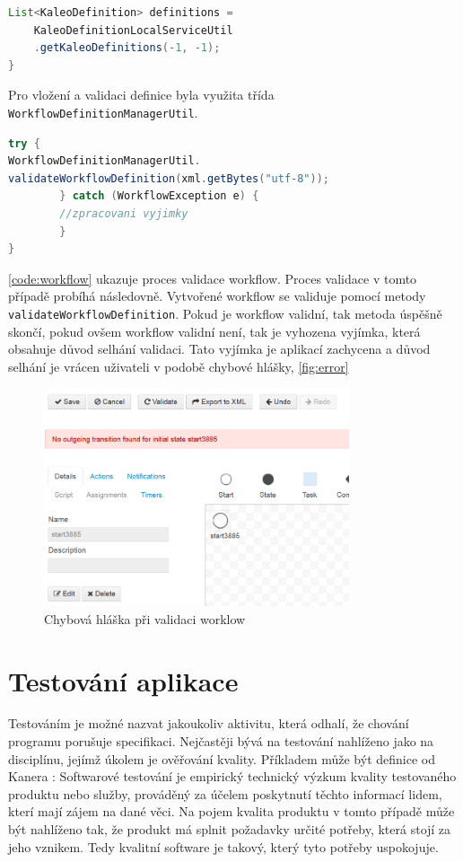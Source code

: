 \documentclass{fithesis}
\begin{document}
\begin{lstlisting}[language=Java, float =h , caption = Načtení workflow definic z portálu , label = code:users ]
 List<KaleoDefinition> definitions = 
	KaleoDefinitionLocalServiceUtil
	.getKaleoDefinitions(-1, -1);
}
\end{lstlisting}

Pro vložení a validaci definice byla využita třída \verb|WorkflowDefinitionManagerUtil|. 

\begin{lstlisting}[language=Java, float =h , caption = Validace workflow pomocí portálového API , label = code:workflow ]
try {
WorkflowDefinitionManagerUtil.
validateWorkflowDefinition(xml.getBytes("utf-8"));
        } catch (WorkflowException e) {
        //zpracovani vyjimky
        }
}
\end{lstlisting}
\autoref{code:workflow} ukazuje proces validace workflow. Proces validace v tomto případě probíhá následovně. Vytvořené workflow se validuje pomocí metody \verb|validateWorkflowDefinition|. Pokud je workflow validní, tak metoda úspěšně skončí, pokud ovšem workflow validní není, tak je vyhozena vyjímka, která obsahuje důvod selhání validaci. Tato vyjímka je aplikací zachycena a důvod selhání je vrácen uživateli v podobě chybové hlášky, 
\autoref{fig:error}

\begin{figure}[htp]
\centering
\includegraphics[width=340px]{images/error_message.png}
\caption{Chybová hláška při validaci worklow}
\label{fig:error}
\end{figure}





\chapter{Testování aplikace}
Testováním je možné nazvat jakoukoliv aktivitu, která odhalí, že chování programu porušuje specifikaci. Nejčastěji bývá na testování nahlíženo jako na disciplínu, jejímž úkolem je ověřování kvality. Příkladem může být definice od Kanera \cite{kaner}: Softwarové testování je empirický technický výzkum kvality testovaného produktu nebo služby, prováděný za účelem poskytnutí těchto informací lidem, kterí mají zájem na dané věci. Na pojem kvalita produktu v tomto případě může být nahlíženo tak, že produkt má splnit požadavky určité potřeby, která stojí za jeho vznikem. Tedy kvalitní software je takový, který tyto potřeby uspokojuje.
\end{document}
